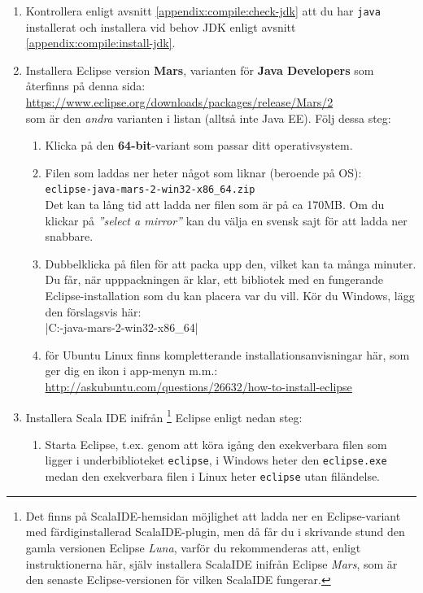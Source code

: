 \begin{enumerate}
\item Kontrollera enligt avsnitt \ref{appendix:compile:check-jdk} att du har \texttt{java} installerat och installera vid behov JDK enligt avsnitt \ref{appendix:compile:install-jdk}.

\item Installera Eclipse version \textbf{Mars}, varianten för \textbf{Java Developers} som återfinns på denna sida: \\ \url{https://www.eclipse.org/downloads/packages/release/Mars/2} \\ som är den \textit{andra} varianten i listan (alltså inte Java EE). Följ dessa steg:
\begin{enumerate}
\item Klicka på den \textbf{64-bit}-variant som passar ditt operativsystem.
\item Filen som laddas ner heter något som liknar (beroende på OS): \\ \texttt{eclipse-java-mars-2-win32-x86\_64.zip} 
\\ Det kan ta lång tid att ladda ner filen som är på ca 170MB. Om du klickar på \textit{''select a mirror''} kan du välja en svensk sajt för att ladda ner snabbare. 

\item Dubbelklicka på filen för att packa upp den, vilket kan ta många minuter. Du får, när upppackningen är klar, ett bibliotek med en fungerande Eclipse-installation som du kan placera var du vill. Kör du Windows, lägg den förslagsvis här:\\ 
\code|C:\eclipse\eclipse-java-mars-2-win32-x86_64|

\item för Ubuntu Linux finns kompletterande installationsanvisningar här, som ger dig en ikon i app-menyn m.m.: 
\\ \url{http://askubuntu.com/questions/26632/how-to-install-eclipse}
\end{enumerate}

\item Installera Scala IDE inifrån%
\footnote{Det finns på ScalaIDE-hemsidan möjlighet att ladda ner en Eclipse-variant med färdiginstallerad ScalaIDE-plugin, men då får du i skrivande stund den gamla versionen Eclipse \textit{Luna}, varför du rekommenderas att, enligt instruktionerna här, själv installera ScalaIDE inifrån Eclipse \textit{Mars}, som är den senaste Eclipse-versionen för vilken ScalaIDE fungerar.}
 Eclipse enligt nedan steg:
\begin{enumerate}
\item Starta Eclipse, t.ex. genom att köra igång den exekverbara filen som ligger i underbiblioteket \texttt{eclipse}, i Windows heter den \texttt{eclipse.exe} medan den exekverbara filen i Linux heter \texttt{eclipse} utan filändelse.


\end{enumerate}
\end{enumerate}
